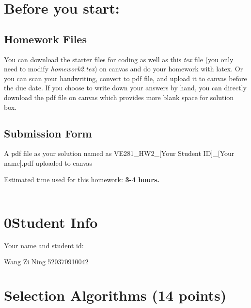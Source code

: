 \documentclass[11pt]{exam}
\begin{document}
\setlength{\parindent}{0pt}
\section*{Before you start:}

\subsection*{Homework Files}
You can download the starter files for coding as well as this \textit{tex} file (you only need to modify \textit{homework2.tex}) on canvas and do your homework with latex. Or you can scan your handwriting, convert to pdf file, and upload it to canvas before the due date. If you choose to write down your answers by hand, you can directly download the pdf file on canvas which provides more blank space for solution box.\\

\subsection*{Submission Form}
A pdf file as your solution named as VE281\_HW2\_[Your Student ID]\_[Your name].pdf uploaded to canvas


Estimated time used for this homework: \textbf{3-4 hours.}
\\\\


\newpage
\section*{0\quad Student Info}
Your name and student id:
\begin{solution}
    Wang Zi Ning 520370910042
\end{solution}

\section{Selection Algorithms (14 points)}
\end{document}
